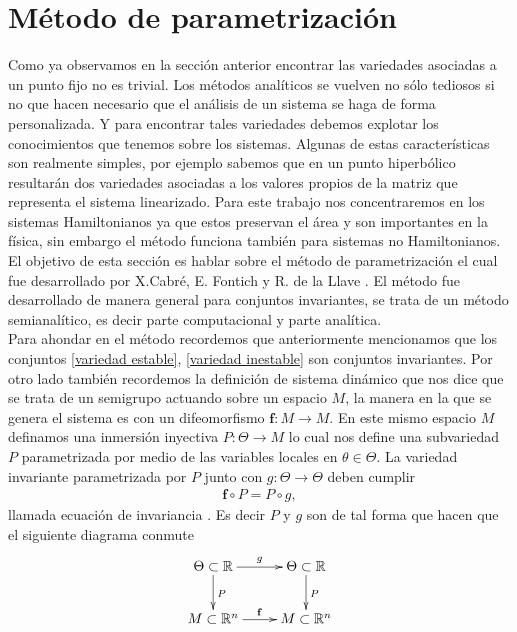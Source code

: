 \section{Método de parametrización}
Como ya observamos en la sección anterior encontrar las variedades asociadas a un punto fijo no es trivial. Los métodos analíticos se vuelven no sólo tediosos si no que hacen necesario que el análisis de un sistema se haga de forma personalizada. Y para encontrar tales variedades debemos explotar los conocimientos que tenemos sobre los sistemas. Algunas de estas características son realmente simples, por ejemplo sabemos que en un punto hiperbólico resultarán dos variedades asociadas a los valores propios de la matriz que representa el sistema linearizado. Para este trabajo nos concentraremos en los sistemas Hamiltonianos ya que estos preservan el área y son importantes en la física, sin embargo el método funciona también para sistemas no Hamiltonianos. El objetivo de esta sección es hablar sobre el método de parametrización el cual fue desarrollado por X.Cabré, E. Fontich y R. de la Llave \cite{Haro}. El método fue desarrollado de manera general para conjuntos invariantes, se trata de un método semianalítico, es decir parte computacional y parte analítica.\\

Para ahondar en el método recordemos que anteriormente mencionamos que los conjuntos \eqref{variedad estable}, \eqref{variedad inestable} son conjuntos invariantes. Por otro lado también recordemos la definición de sistema dinámico que nos dice que se trata de un semigrupo actuando sobre un espacio $M$, la manera en la que se genera el sistema es con un difeomorfismo $\mathbf{f}:M \rightarrow M$. En este mismo espacio $M$ definamos una inmersión inyectiva $P:\Theta \rightarrow M$  lo cual nos define una subvariedad $P$ parametrizada por medio de las variables locales en $\theta \in \Theta$. La variedad invariante parametrizada por $P$  junto con $g:\Theta \rightarrow \Theta$ deben cumplir 
\begin{eqnarray}
\mathbf{f} \circ P = P \circ g,  \label{Ecua de invariancia}
\end{eqnarray}
llamada ecuación de invariancia \cite{Haro}.
Es decir $P$ y $g$ son de tal forma que hacen que el siguiente diagrama conmute
\begin{eqnarray}
\xymatrix{
\Theta\subset\mathbb{R} \ar[d]^{P} \ar[r]^{g} & \Theta\subset\mathbb{R} \ar[d]^{P} \\
M\subset\mathbb{R}^{n} \ar[r]^{\mathbf{f}} & M\subset\mathbb{R}^{n}
}\label{conmutativo}
\end{eqnarray}

